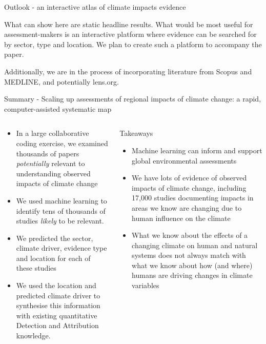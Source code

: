 \documentclass[9pt]{beamer}
\begin{document}
\begin{frame}{Outlook - an interactive atlas of climate impacts evidence}

What can show here are static headline results. What would be most useful for assessment-makers is an interactive platform where evidence can be searched for by sector, type and location. We plan to create such a platform to accompany the paper. 

\medskip

Additionally, we are in the process of incorporating literature from Scopus and MEDLINE, and potentially lens.org.
\end{frame}



\begin{frame}{Summary - Scaling up assessments of regional impacts of climate change: a rapid, computer-assisted systematic map}

\begin{columns}
	\small
	\begin{column}{0.5\linewidth}
		\begin{itemize}
			\item In a large collaborative coding exercise, we examined thousands of papers \textit{potentially} relevant to understanding observed impacts of climate change
			\item We used machine learning to identify tens of thousands of studies \textit{likely} to be relevant.
			\item We predicted the sector, climate driver, evidence type and location for each of these studies
			\item We used the location and predicted climate driver to synthesise this information with existing quantitative Detection and Attribution knowledge.
		\end{itemize}
	\end{column}

	\begin{column}{0.5\linewidth}
		
		\begin{block}{Takeaways}
			\begin{itemize}
				\item Machine learning can inform and support global environmental assessments
				\item We have lots of evidence of observed impacts of climate change, including 17,000 studies documenting impacts in areas we know are changing due to human influence on the climate
				\item What we know about the effects of a changing climate on human and natural systems does not always match with what we know about how (and where) humans are driving changes in climate variables 
			\end{itemize}
		\end{block}
		

\end{column}
\end{columns}
\end{frame}
\end{document}
